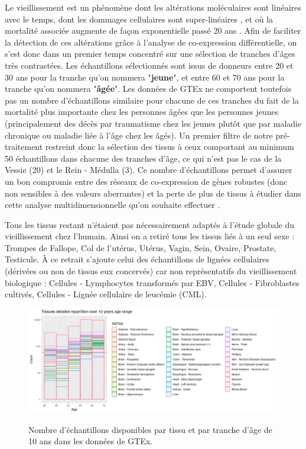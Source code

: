 Le vieillissement est un phénomène dont les altérations moléculaires sont linéaires avec le temps, dont les dommages cellulaires sont super-linéaires \cite{Todhunter2018}, et où la mortalité associée augmente de façon exponentielle passé 20 ans \cite{Finch2016}. Afin de faciliter la détection de ces altérations grâce à l'analyse de co-expression différentielle, on s'est donc dans un premier temps concentré sur une sélection de tranches d'âges très contrastées. Les échantillons sélectionnés sont issus de donneurs entre 20 et 30 ans pour la tranche qu'on nommera "\textbf{jeune}", et entre 60 et 70 ans pour la tranche qu'on nommera "\textbf{âgée}". Les données de GTEx ne comportent toutefois pas un nombre d'échantillons similaire pour chacune de ces tranches du fait de la mortalité plus importante chez les personnes âgées que les personnes jeunes (principalement des décès par traumatisme chez les jeunes plutôt que par maladie chronique ou maladie liée à l'âge chez les âgés). Un premier filtre de notre pré-traitement restreint donc la sélection des tissus à ceux comportant au minimum 50 échantillons dans chacune des tranches d'âge, ce qui n'est pas le cas de la Vessie (20) et le Rein - Médulla (3). Ce nombre d'échantillons permet d'assurer un bon compromis entre des réseaux de co-expression de gènes robustes (donc non sensibles à des valeurs aberrantes) et la perte de plus de tissus à étudier dans cette analyse multidimensionnelle qu'on souhaite effectuer \cite{Liesecke2019}.

Tous les tissus restant n'étaient pas nécessairement adaptés à l'étude globale du vieillissement chez l'humain. Ainsi on a retiré tous les tissus liés à un seul sexe : Trompes de Fallope, Col de l'utérus, Utérus, Vagin, Sein, Ovaire, Prostate, Testicule. À ce retrait s'ajoute celui des échantillons de lignées cellulaires (dérivées ou non de tissus eux concervés) car non représentatifs du vieillissement biologique : Cellules - Lymphocytes transformés par EBV, Cellules - Fibroblastes cultivés, Cellules - Lignée cellulaire de leucémie (CML). 


\begin{figure}[h]
    \centering
    \includegraphics[width=1\textwidth]{img/chap2/chap2_sample_count_by_tissu.png}
    \label{figure:sample_count_by_tissu}
    \caption{Nombre d'échantillons disponibles par tissu et par tranche d'âge de 10 ans dans les données de GTEx.}
\end{figure}



